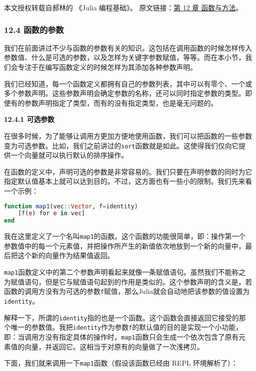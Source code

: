 
本文授权转载自郝林的 《Julia 编程基础》。 原文链接：\href{https://github.com/hyper0x/JuliaBasics/blob/master/book/ch12.md}{第 12 章 函数与方法}。

\subsubsection{12.4 函数的参数}

我们在前面讲过不少与函数的参数有关的知识。这包括在调用函数的时候怎样传入参数值、什么是可选的参数，以及怎样为关键字参数赋值，等等。而在本小节，我们会专注于在编写函数定义的时候怎样为其添加各种参数声明。

我们已经知道，每一个函数定义都拥有自己的参数列表，其中可以有零个、一个或多个参数声明。这些参数声明会确定参数的名称，还可以同时指定参数的类型。即使有的参数声明指定了类型，而有的没有指定类型，也是毫无问题的。

\textbf{12.4.1 可选参数}

在很多时候，为了能够让调用方更加方便地使用函数，我们可以把函数的一些参数变为可选参数。比如，我们之前讲过的\verb`sort`函数就是如此。这使得我们仅向它提供一个向量就可以执行默认的排序操作。

在函数的定义中，声明可选的参数是非常容易的。我们只要在声明参数的同时为它指定默认值基本上就可以达到目的。不过，这方面也有一些小的限制。我们先来看一个示例：

\begin{lstlisting}[language=julia]
function map1(vec::Vector, f=identity)
    [f(e) for e in vec]
end
\end{lstlisting}

我在这里定义了一个名叫\verb`map1`的函数。这个函数的功能很简单，即：操作第一个参数值中的每一个元素值，并把操作所产生的新值依次地放到一个新的向量中，最后把这个新的向量作为结果值返回。

\verb`map1`函数定义中的第二个参数声明看起来就像一条赋值语句。虽然我们不能称之为赋值语句，但是它与赋值语句起到的作用是类似的。这个参数声明的含义是，若函数的调用方没有为可选的参数\verb`f`赋值，那么Julia就会自动地把该参数的值设置为\verb`identity`。

解释一下，所谓的\verb`identity`指的也是一个函数。这个函数会直接返回它接受的那个唯一的参数值。我把\verb`identity`作为参数\verb`f`的默认值的目的是实现一个小功能，即：当调用方没有指定具体的操作时，\verb`map1`函数只会生成一个依次包含了原有元素值的向量，并返回它。这相当于对原有的向量做了一次浅拷贝。

下面，我们就来调用一下\verb`map1`函数（假设该函数已经由 REPL 环境解析了）：

